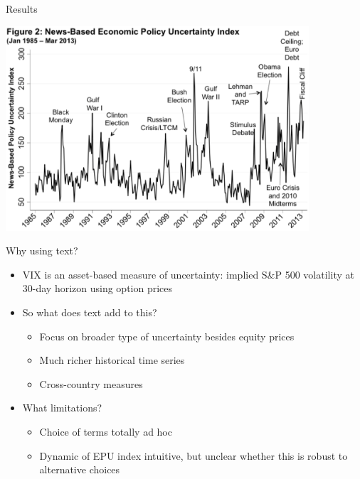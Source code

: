 \documentclass[english]{beamer}
\begin{document}
\begin{frame}{Results}
\begin{centering}
\includegraphics[height=3in]{Images/fig18}
\end{centering}
\end{frame}
%
\begin{frame}{Why using text?}
\begin{itemize}
\setlength{\itemsep}{1.2em}
\item VIX is an asset-based measure of uncertainty: implied S\&P 500 volatility at 30-day horizon using option prices
\item So what does text add to this?
\vspace{7pt}
\begin{itemize}
\setlength{\itemsep}{0.8em}
\item Focus on broader type of uncertainty besides equity prices
\item Much richer historical time series
\item Cross-country measures
\end{itemize}
\pause
\item What limitations?
\vspace{7pt}
\begin{itemize}
\setlength{\itemsep}{0.8em}
\item Choice of terms totally ad hoc
\item Dynamic of EPU index intuitive, but unclear whether this is robust to alternative choices
\end{itemize}
\end{itemize}
\end{frame}
\end{document}
